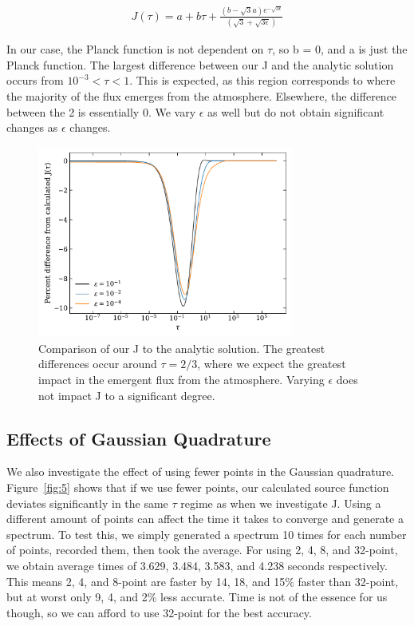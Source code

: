 \documentclass[12pt]{article}
\begin{document}
\begin{equation}
\begin{split}
   J(\tau) = a + b\tau + \frac{(b - \sqrt{3}a)e^{-\sqrt{3\epsilon}}}{(\sqrt{3}+\sqrt{3\epsilon})}
\end{split}
\label{eq:24}
\end{equation}

In our case, the Planck function is not dependent on $\tau$, so b = 0, and a is just the Planck function. 
The largest difference between our J and the analytic solution occurs from $10^{-3} < \tau < 1$. This is expected, as this region corresponds to where the majority of the flux emerges from the atmosphere. Elsewhere, the difference between the 2 is essentially 0. We vary $\epsilon$ as well but do not obtain significant changes as $\epsilon$ changes.


\begin{figure}[ht]
 \centering
 \includegraphics[width=0.75\textwidth]{J_comparison.pdf}
 \caption{Comparison of our J to the analytic solution. The greatest differences occur around $\tau = 2/3$, where we expect the greatest impact in the emergent flux from the atmosphere. Varying $\epsilon$ does not impact J to a significant degree.}
 \label{fig:4}
\end{figure}

\subsection{Effects of Gaussian Quadrature}

We also investigate the effect of using fewer points in the Gaussian quadrature. Figure~\ref{fig:5} shows that if we use fewer points, our calculated source function deviates significantly in the same $\tau$ regime as when we investigate J. 
Using a different amount of points can affect the time it takes to converge and generate a spectrum. To test this, we simply generated a spectrum 10 times for each number of points, recorded them, then took the average. For using 2, 4, 8, and 32-point, we obtain average times of 3.629, 3.484, 3.583, and 4.238 seconds respectively. This means 2, 4, and 8-point are faster by 14, 18, and 15\% faster than 32-point, but at worst only 9, 4, and 2\% less accurate. Time is not of the essence for us though, so we can afford to use 32-point for the best accuracy.
\end{document}
